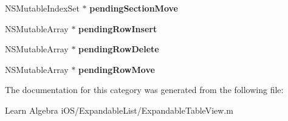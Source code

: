 \begin{DoxyCompactItemize}
\item 
\hypertarget{category_expandable_table_view_07_08_a8443da32be05ecc6d5a99a18b7850845}{N\-S\-Mutable\-Index\-Set $\ast$ {\bfseries pending\-Section\-Move}}\label{category_expandable_table_view_07_08_a8443da32be05ecc6d5a99a18b7850845}

\item 
\hypertarget{category_expandable_table_view_07_08_a46ab3ad1cad3578a716837f0d7f58fee}{N\-S\-Mutable\-Array $\ast$ {\bfseries pending\-Row\-Insert}}\label{category_expandable_table_view_07_08_a46ab3ad1cad3578a716837f0d7f58fee}

\item 
\hypertarget{category_expandable_table_view_07_08_a662a8c5e24a92a87f83069eb5cf71750}{N\-S\-Mutable\-Array $\ast$ {\bfseries pending\-Row\-Delete}}\label{category_expandable_table_view_07_08_a662a8c5e24a92a87f83069eb5cf71750}

\item 
\hypertarget{category_expandable_table_view_07_08_a5f6a8800c183a8f54ef8d9db1368d2e0}{N\-S\-Mutable\-Array $\ast$ {\bfseries pending\-Row\-Move}}\label{category_expandable_table_view_07_08_a5f6a8800c183a8f54ef8d9db1368d2e0}

\end{DoxyCompactItemize}


The documentation for this category was generated from the following file\-:\begin{DoxyCompactItemize}
\item 
Learn Algebra i\-O\-S/\-Expandable\-List/Expandable\-Table\-View.\-m\end{DoxyCompactItemize}
